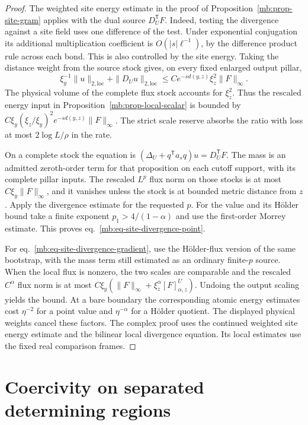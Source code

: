\documentclass[11pt,letterpaper,reqno]{amsart}
\numberwithin{equation}{section}
\renewcommand{\eqref}[1]{\textup{eq.~\ref{#1}}}
\theoremstyle{definition}
\theoremstyle{remark}
\begin{document}
\begin{proof}
The weighted site energy estimate in the proof of
Proposition~\ref{mb:prop-site-gram} applies with the dual
source \(D_U^{\mathsf T}F\). Indeed, testing the divergence
against a site field uses one difference of the test.
Under exponential conjugation its additional multiplication
coefficient is \(O(|s|\ell^{-1})\), by the difference
product rule across each bond. This is also controlled
by the site energy. Taking the distance weight from the
source stock gives, on every fixed enlarged output pillar,
\[
 \xi_y^{-1}\|u\|_{2,\mathrm{loc}}
       +\|D_Uu\|_{2,\mathrm{loc}}
   \le C e^{-s d(y,z)} \xi_z^2\|F\|_\infty .
\]
The physical volume of the complete flux stock accounts
for \(\xi_z^2\). Thus the rescaled energy input in
Proposition~\ref{mb:prop-local-scalar} is bounded by
\(C\xi_y(\xi_z/\xi_y)^2 e^{-s d(y,z)}\|F\|_\infty\).
The strict scale reserve absorbs the ratio with loss at most
\(2\log L/\rho\) in the rate.

On a complete stock the equation is
\((\Delta_U+q^{\mathsf T}a_s q)u=D_U^{\mathsf T}F\).
The mass is an admitted zeroth-order term for that
proposition on each cutoff support, with its complete
pillar inputs. The rescaled \(L^p\) flux norm on those
stocks is at most \(C\xi_y\|F\|_\infty\), and it vanishes
unless the stock is at bounded metric distance from \(z\).
Apply the divergence estimate for the requested \(p\).
For the value and its H\"older bound take a finite
exponent \(p_1>4/(1-\alpha)\) and use the first-order Morrey
estimate. This proves \eqref{mb:eq-site-divergence-point}.

For \eqref{mb:eq-site-divergence-gradient}, use the
H\"older-flux version of the same bootstrap, with the
mass term still estimated as an ordinary finite-\(p\)
source. When the local flux is nonzero, the two scales
are comparable and the rescaled \(C^\alpha\) flux norm
is at most \(C\xi_y(\|F\|_\infty+\xi_z^\alpha[F]_{\alpha,z}^{U})\).
Undoing the output scaling yields the bound. At a bare
boundary the corresponding atomic energy estimates cost
\(\eta^{-2}\) for a point value and \(\eta^{-\alpha}\)
for a H\"older quotient. The displayed physical weights
cancel these factors. The complex proof uses the continued
weighted site energy estimate and the bilinear local
divergence equation. Its local estimates use the fixed
real comparison frames.
\end{proof}


\section{Coercivity on separated determining regions}
\label{mb:sec-layered-gap}
\end{document}
